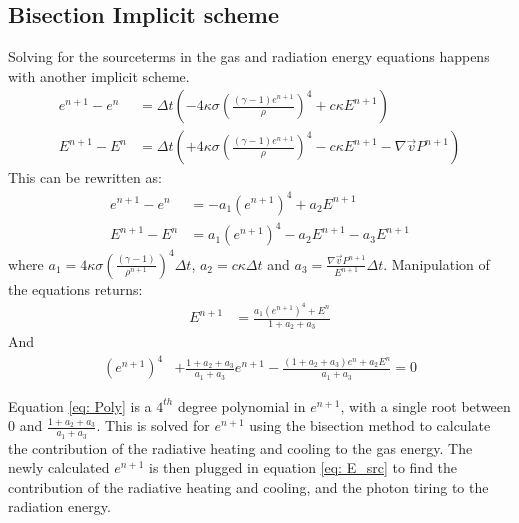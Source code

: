 \subsection{Bisection Implicit scheme} \label{subsection: BIS}
Solving for the sourceterms in the gas and radiation energy equations happens with another implicit scheme. 
\begin{align}
e^{n+1} - e^n &= \Delta t \left( -4\kappa \sigma \left(\frac{(\gamma - 1)e^{n+1}}{\rho}\right)^4 + c \kappa E^{n+1} \right) \\ 
E^{n+1} - E^n &= \Delta t \left( +4\kappa \sigma \left(\frac{(\gamma - 1)e^{n+1}}{\rho}\right)^4 - c \kappa E^{n+1} -\nabla \vec{v} P^{n+1} \right)
\end{align} 
This can be rewritten as:
\begin{align}
e^{n+1} - e^n &= -a_1 \left( e^{n+1}\right)^4 + a_2 E^{n+1}  \\ 
E^{n+1} - E^n &= a_1 \left( e^{n+1} \right)^4 - a_2 E^{n+1} - a_3 E^{n+1} 
\end{align}
where $a_1 = 4\kappa \sigma \left(\frac{(\gamma - 1)}{\rho^{n+1}}\right)^4 \Delta t$, $a_2 = c \kappa \Delta t$ and $a_3 = \frac{\nabla \vec{v} P^{n+1} }{E^{n+1}} \Delta t$. Manipulation of the equations returns:
\begin{align}
E^{n+1} &= \frac{a_1 \left( e^{n+1} \right)^4 + E^n}{1 + a_2 + a_3} \label{eq: E_src}
\end{align}
And
\begin{align}
\left( e^{n+1} \right)^4 &+ \frac{1 + a_2 + a_3}{a_1 + a_3}e^{n+1} -  \frac{(1 + a_2 + a_3)e^n + a_2 E^n}{a_1 + a_3} = 0 \label{eq: Poly}
\end{align}

Equation \eqref{eq: Poly} is a $4^{th}$ degree polynomial in $e^{n+1}$, with a single root between $0$ and $\frac{1 + a_2 + a_3}{a_1 + a_3}$. This is solved for $e^{n+1}$ using the bisection method to calculate the contribution of the radiative heating and cooling to the gas energy. The newly calculated $e^{n+1}$ is then plugged in equation \eqref{eq: E_src} to find the contribution of the radiative heating and cooling, and the photon tiring to the radiation energy.

